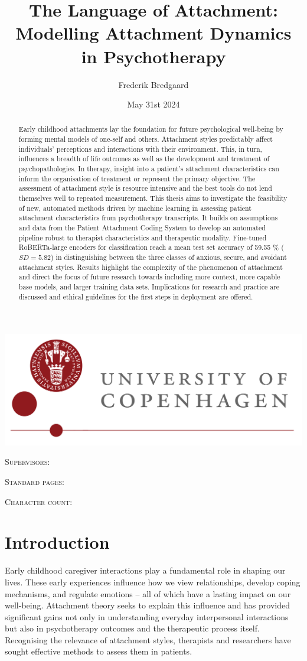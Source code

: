 \documentclass[12pt]{report}
\title{The Language of Attachment: Modelling Attachment Dynamics in Psychotherapy}
\author{Frederik Bredgaard}
\date{May 31st 2024}
\makeatletter
\newcommand{\supervisorOne}[1]{\def\@supervisorOne{#1}} %
\newcommand{\supervisorTwo}[1]{\def\@supervisorTwo{#1}} %
\newcommand{\university}[1]{\def\@university{#1}} %
\newcommand{\faculty}[1]{\def\@faculty{#1}} %
\newcommand{\pageCount}[1]{\def\@pageCount{#1}} %
\newcommand{\charCount}[1]{\def\@charCount{#1}} %
\renewcommand{\maketitle}{
    \begin{titlepage}
        \centering
        \includegraphics[width=\textwidth]{figures/ku_logo_uk_hh.png}\par\vspace{1cm} %
        \vspace{1cm}
        \textsc{\LARGE \@title}\par\vspace{1.5cm} %
        \textsc{\large \@author}\par\vspace{1cm} %
        \textsc{\large Supervisors:}\par %
        \textsc{\large \@supervisorOne}\par %
        \textsc{\large \@supervisorTwo}\par\vspace{1cm} %
        \textsc{\small Standard pages: \@pageCount}\par %
        \textsc{\small Character count: \@charCount}\par %
        \vfill
        \@date\par\vspace{0.5cm} %
        \textsc{\large \@faculty}\par %
        \textsc{\large \@university}\par %
    \end{titlepage}
}
\makeatother
\begin{document}
\maketitle
\begin{abstract}
    Early childhood attachments lay the foundation for future psychological well-being by forming mental models of one-self and others.
    Attachment styles predictably affect individuals' perceptions and interactions with their environment.
    This, in turn, influences a breadth of life outcomes as well as the development and treatment of psychopathologies.
    In therapy, insight into a patient's attachment characteristics can inform the organisation of treatment or represent the primary objective.
    The assessment of attachment style is resource intensive and the best tools do not lend themselves well to repeated measurement.
    This thesis aims to investigate the feasibility of new, automated methods driven by machine learning in assessing patient attachment characteristics from psychotherapy transcripts.
    It builds on assumptions and data from the Patient Attachment Coding System \cite{Talia2017} to develop an automated pipeline robust to therapist characteristics and therapeutic modality.
    Fine-tuned RoBERTa-large encoders for classification reach a mean test set accuracy of 59.55 \% ($SD=5.82$) in distinguishing between the three classes of anxious, secure, and avoidant attachment styles.
    Results highlight the complexity of the phenomenon of attachment and direct the focus of future research towards including more context, more capable base models, and larger training data sets.
    Implications for research and practice are discussed and ethical guidelines for the first steps in deployment are offered.
\end{abstract}
\tableofcontents

\chapter*{Introduction}
Early childhood caregiver interactions play a fundamental role in shaping our lives.
These early experiences influence how we view relationships, develop coping mechanisms, and regulate emotions -- all of which have a lasting impact on our well-being.
Attachment theory seeks to explain this influence and has provided significant gains not only in understanding everyday interpersonal interactions but also in psychotherapy outcomes and the therapeutic process itself.
Recognising the relevance of attachment styles, therapists and researchers have sought effective methods to assess them in patients.
\end{document}
